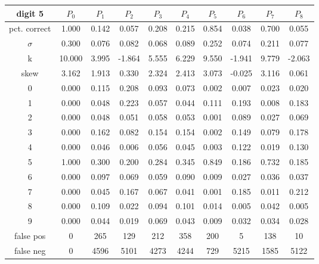 \documentclass{report}
\begin{document}
\begin{tabular}{ | c ||  c | c | c | c | c | c | c | c | c |}
 digit 5 & $P_0$ & $P_1$ & $P_2$ & $P_3$ & $P_4$ & $P_5$ & $P_6$ & $P_7$ & $P_8$ \\
\hline \hline
pct. correct  & 1.000 & 0.142 & 0.057 & 0.208 & 0.215 & 0.854 & 0.038 & 0.700 & 0.055 \\
\hline
$\sigma$ & 0.300& 0.076& 0.082& 0.068& 0.089& 0.252& 0.074& 0.211& 0.077 \\
\hline
k & 10.000& 3.995& -1.864& 5.555& 6.229& 9.550& -1.941& 9.779& -2.063 \\
\hline
skew & 3.162& 1.913& 0.330& 2.324& 2.413& 3.073& -0.025& 3.116& 0.061 \\
\hline
0 & 0.000 & 0.115 & 0.208 & 0.093 & 0.073 & 0.002 & 0.007 & 0.023 & 0.020 \\
\hline
1 & 0.000 & 0.048 & 0.223 & 0.057 & 0.044 & 0.111 & 0.193 & 0.008 & 0.183 \\
\hline
2 & 0.000 & 0.048 & 0.051 & 0.058 & 0.053 & 0.001 & 0.089 & 0.027 & 0.069 \\
\hline
3 & 0.000 & 0.162 & 0.082 & 0.154 & 0.154 & 0.002 & 0.149 & 0.079 & 0.178 \\
\hline
4 & 0.000 & 0.046 & 0.006 & 0.056 & 0.045 & 0.003 & 0.122 & 0.019 & 0.130 \\
\hline
5 & 1.000 & 0.300 & 0.200 & 0.284 & 0.345 & 0.849 & 0.186 & 0.732 & 0.185 \\
\hline
6 & 0.000 & 0.097 & 0.069 & 0.059 & 0.090 & 0.009 & 0.027 & 0.036 & 0.037 \\
\hline
7 & 0.000 & 0.045 & 0.167 & 0.067 & 0.041 & 0.001 & 0.185 & 0.011 & 0.212 \\
\hline
8 & 0.000 & 0.109 & 0.022 & 0.094 & 0.101 & 0.014 & 0.005 & 0.042 & 0.005 \\
\hline
9 & 0.000 & 0.044 & 0.019 & 0.069 & 0.043 & 0.009 & 0.032 & 0.034 & 0.028 \\
\hline
false pos  & 0 & 265 & 129 & 212 & 358 & 200 & 5 & 138 & 10 \\
\hline
false neg  & 0 & 4596 & 5101 & 4273 & 4244 & 729 & 5215 & 1585 & 5122 \\
\hline
\end{tabular}

\vspace{1cm}
\end{document}
